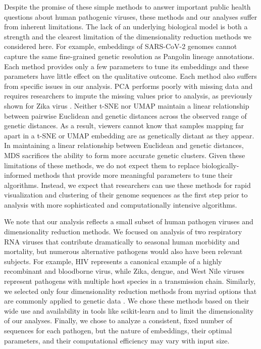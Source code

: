 \documentclass[10pt,letterpaper]{article}
\begin{document}
Despite the promise of these simple methods to answer important public health questions about human pathogenic viruses, these methods and our analyses suffer from inherent limitations.
The lack of an underlying biological model is both a strength and the clearest limitation of the dimensionality reduction methods we considered here.
For example, embeddings of SARS-CoV-2 genomes cannot capture the same fine-grained genetic resolution as Pangolin lineage annotations.
Each method provides only a few parameters to tune its embeddings and these parameters have little effect on the qualitative outcome.
Each method also suffers from specific issues in our analysis.
PCA performs poorly with missing data and requires researchers to impute the missing values prior to analysis, as previously shown for Zika virus \cite{metsky_2017}.
Neither t-SNE nor UMAP maintain a linear relationship between pairwise Euclidean and genetic distances across the observed range of genetic distances.
As a result, viewers cannot know that samples mapping far apart in a t-SNE or UMAP embedding are as genetically distant as they appear.
In maintaining a linear relationship between Euclidean and genetic distances, MDS sacrifices the ability to form more accurate genetic clusters.
Given these limitations of these methods, we do not expect them to replace biologically-informed methods that provide more meaningful parameters to tune their algorithms.
Instead, we expect that researchers can use these methods for rapid visualization and clustering of their genome sequences as the first step prior to analysis with more sophisticated and computationally intensive algorithms.

We note that our analysis reflects a small subset of human pathogen viruses and dimensionality reduction methods.
We focused on analysis of two respiratory RNA viruses that contribute dramatically to seasonal human morbidity and mortality, but numerous alternative pathogens would also have been relevant subjects.
For example, HIV represents a canonical example of a highly recombinant and bloodborne virus, while Zika, dengue, and West Nile viruses represent pathogens with multiple host species in a transmission chain.
Similarly, we selected only four dimensionality reduction methods from myriad options that are commonly applied to genetic data \cite{Armstrong2022}.
We chose these methods based on their wide use and availability in tools like scikit-learn \cite{Pedregosa2011} and to limit the dimensionality of our analyses.
Finally, we chose to analyze a consistent, fixed number of sequences for each pathogen, but the nature of embeddings, their optimal parameters, and their computational efficiency may vary with input size.
\end{document}

